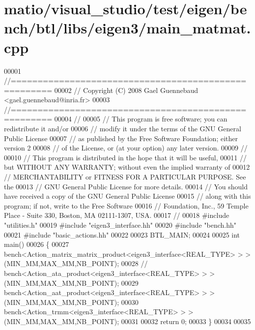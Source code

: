 \hypertarget{matio_2visual__studio_2test_2eigen_2bench_2btl_2libs_2eigen3_2main__matmat_8cpp_source}{}\section{matio/visual\+\_\+studio/test/eigen/bench/btl/libs/eigen3/main\+\_\+matmat.cpp}
\label{matio_2visual__studio_2test_2eigen_2bench_2btl_2libs_2eigen3_2main__matmat_8cpp_source}

\begin{DoxyCode}
00001 \textcolor{comment}{//=====================================================}
00002 \textcolor{comment}{// Copyright (C) 2008 Gael Guennebaud <gael.guennebaud@inria.fr>}
00003 \textcolor{comment}{//=====================================================}
00004 \textcolor{comment}{//}
00005 \textcolor{comment}{// This program is free software; you can redistribute it and/or}
00006 \textcolor{comment}{// modify it under the terms of the GNU General Public License}
00007 \textcolor{comment}{// as published by the Free Software Foundation; either version 2}
00008 \textcolor{comment}{// of the License, or (at your option) any later version.}
00009 \textcolor{comment}{//}
00010 \textcolor{comment}{// This program is distributed in the hope that it will be useful,}
00011 \textcolor{comment}{// but WITHOUT ANY WARRANTY; without even the implied warranty of}
00012 \textcolor{comment}{// MERCHANTABILITY or FITNESS FOR A PARTICULAR PURPOSE.  See the}
00013 \textcolor{comment}{// GNU General Public License for more details.}
00014 \textcolor{comment}{// You should have received a copy of the GNU General Public License}
00015 \textcolor{comment}{// along with this program; if not, write to the Free Software}
00016 \textcolor{comment}{// Foundation, Inc., 59 Temple Place - Suite 330, Boston, MA  02111-1307, USA.}
00017 \textcolor{comment}{//}
00018 \textcolor{preprocessor}{#include "utilities.h"}
00019 \textcolor{preprocessor}{#include "eigen3\_interface.hh"}
00020 \textcolor{preprocessor}{#include "bench.hh"}
00021 \textcolor{preprocessor}{#include "basic\_actions.hh"}
00022 
00023 BTL\_MAIN;
00024 
00025 \textcolor{keywordtype}{int} main()
00026 \{
00027   bench<Action\_matrix\_matrix\_product<eigen3\_interface<REAL\_TYPE> > >(MIN\_MM,MAX\_MM,NB\_POINT);
00028 \textcolor{comment}{//   bench<Action\_ata\_product<eigen3\_interface<REAL\_TYPE> > >(MIN\_MM,MAX\_MM,NB\_POINT);}
00029   bench<Action\_aat\_product<eigen3\_interface<REAL\_TYPE> > >(MIN\_MM,MAX\_MM,NB\_POINT);
00030   bench<Action\_trmm<eigen3\_interface<REAL\_TYPE> > >(MIN\_MM,MAX\_MM,NB\_POINT);
00031 
00032   \textcolor{keywordflow}{return} 0;
00033 \}
00034 
00035 
\end{DoxyCode}
